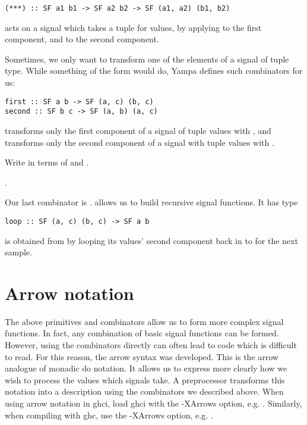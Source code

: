 \begin{lstlisting}
(***) :: SF a1 b1 -> SF a2 b2 -> SF (a1, a2) (b1, b2)
\end{lstlisting}

\noindent {} acts on a signal which takes a tuple for values, by applying  to the first component, and  to the second component.

Sometimes, we only want to transform one of the elements of a signal of tuple type. While something of the form  would do, Yampa defines such combinators for us:

\begin{lstlisting}
first :: SF a b -> SF (a, c) (b, c)
second :: SF b c -> SF (a, b) (a, c)
\end{lstlisting}

\noindent {} transforms only the first component of a signal of tuple values with , and  transforms only the second component of a signal with tuple values with .

\begin{exercise}
Write  in terms of  and .
\end{exercise}

\begin{observation}
.
\end{observation}

Our last combinator is .  allows us to build recursive signal functions. It has type

\begin{lstlisting}
loop :: SF (a, c) (b, c) -> SF a b
\end{lstlisting}

\noindent {} is obtained from  by looping its values' second component back in to  for the next sample.

\section{Arrow notation}

The above primitives and combinators allow us to form more complex signal functions. In fact, any combination of basic signal functions can be formed. However, using the combinators directly can often lead to code which is difficult to read. For this reason, the arrow syntax was developed. This is the arrow analogue of monadic do notation. It allows us to express more clearly how we wish to process the values which signals take. A preprocessor transforms this notation into a description using the combinators we described above. When using arrow notation in ghci, load ghci with the -XArrows option, e.g. . Similarly, when compiling with ghc, use the -XArrows option, e.g. .


